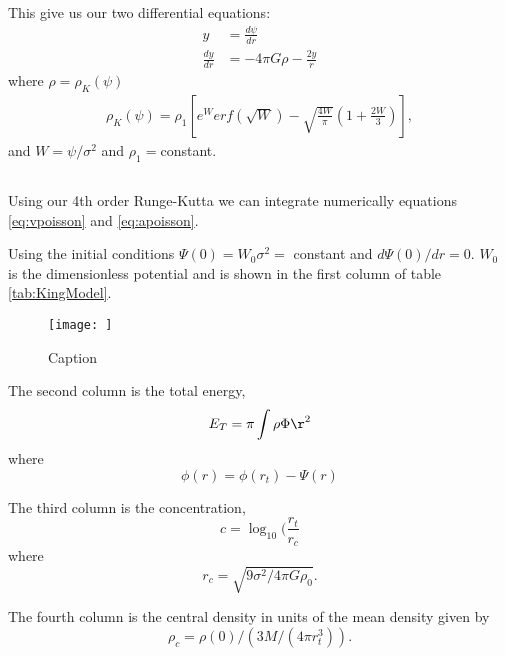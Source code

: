 This give us our two differential equations:
\begin{align}
    y&=\frac{d\psi}{dr}
    \label{eq:vpoisson}\\
    \frac{dy}{dr}&=-4\pi G\rho-\frac{2y}{r}
    \label{eq:apoisson}
\end{align}
where $\rho=\rho_K(\psi)$
\begin{equation}
    \begin{split}
        \rho_K(\psi)=\rho_1\left[ e^{W}erf(\sqrt{W})-\sqrt{\frac{4W}{\pi}}\left(1+\frac{2W}{3}\right)\right],
    \end{split}
\end{equation}
and $W=\psi/\sigma^2$ and $\rho_1=$constant.


\subsection{}

Using our 4th order Runge-Kutta we can integrate numerically equations \ref{eq:vpoisson} and \ref{eq:apoisson}.

Using the initial conditions $\Psi(0) = W_0\sigma^2 = $ constant and $d\Psi(0)/dr = 0$. $W_0$ is the dimensionless potential and is shown in the first column of table \ref{tab:KingModel}. 

\begin{figure}
    \centering
    \texttt{[image: ]}
    \caption{Caption}
    \label{fig:my_label}
\end{figure}

The second column is the total energy,
\begin{equation}
    E_T=\pi\int\rho\Phi\r^2
    \label{eq:TotalEnergy}
\end{equation}
where 
\begin{equation}
    \phi(r) = \phi(r_t)-\Psi(r)
    \label{eq: Potential}
\end{equation}

The third column is the concentration,
\begin{equation}
    c = \log_10(\frac{r_t}{r_c}
\end{equation}
where
\begin{equation}
    r_c=\sqrt{9\sigma^2/4\pi G \rho_0}.
\end{equation}

The fourth column is the central density in units of the mean density given by
\begin{equation}
    \rho_c = \rho(0)/(3M/(4\pi r_t^3)).
\end{equation}

